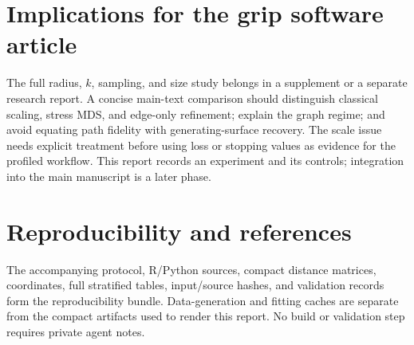 \documentclass[11pt,letterpaper,landscape]{article}
\begin{document}
\clearpage
\section*{Implications for the grip software article}


The full radius, $k$, sampling, and size study belongs in a supplement or a
separate research report. A concise main-text comparison should distinguish
classical scaling, stress MDS, and edge-only refinement; explain the graph
regime; and avoid equating path fidelity with generating-surface recovery.
The scale issue needs explicit treatment before using loss or stopping values
as evidence for the profiled workflow. This report records an experiment and
its controls; integration into the main manuscript is a later phase.


\clearpage
\section*{Reproducibility and references}
The accompanying protocol, R/Python sources, compact distance matrices,
coordinates, full stratified tables, input/source hashes, and validation
records form the reproducibility bundle. Data-generation and fitting caches
are separate from the compact artifacts used to render this report.
No build or validation step requires private agent notes.


\end{document}
